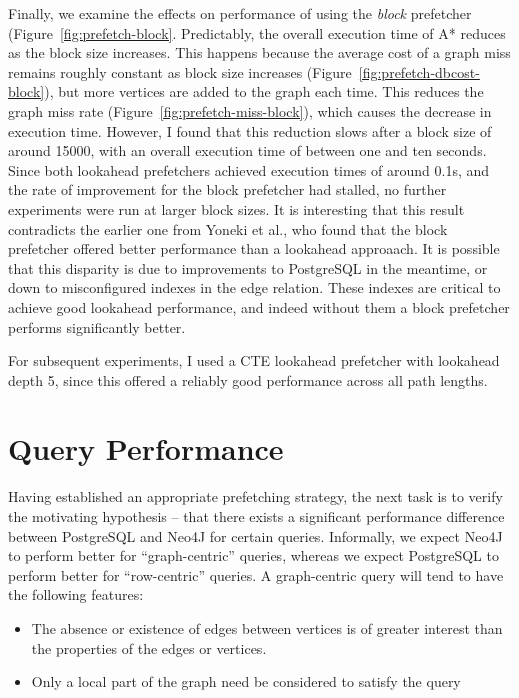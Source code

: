 Finally, we examine the effects on performance of using the \textit{block}
prefetcher (Figure~\ref{fig:prefetch-block}. Predictably, the overall
execution time of A* reduces as the block size increases. This happens because
the average cost of a graph miss remains roughly constant as block size
increases (Figure~\ref{fig:prefetch-dbcost-block}), but more vertices are
added to the graph each time. This reduces the graph miss rate
(Figure~\ref{fig:prefetch-miss-block}), which causes the decrease in execution
time. However, I found that this reduction slows after a block size of around
15000, with an  overall execution time of between one and ten seconds. Since
both lookahead prefetchers achieved execution times of around 0.1s, and the
rate of improvement for the block prefetcher had stalled, no further
experiments were run at larger block sizes. It is interesting that this result
contradicts the earlier one from Yoneki et al., who found that the block
prefetcher offered better performance than a lookahead approaach. It is
possible that this disparity is due to improvements to PostgreSQL in the
meantime, or down to misconfigured indexes in the edge relation. These indexes
are critical to achieve good lookahead performance, and indeed without them a
block prefetcher performs significantly better.


For subsequent experiments, I used a CTE lookahead prefetcher with lookahead depth
5, since this offered a reliably good performance across all path lengths. 


\section{Query Performance} %
\label{sec:query_performance}
 
Having established an appropriate prefetching strategy, the next task is to
verify the motivating hypothesis -- that there exists a significant
performance difference between PostgreSQL and Neo4J for certain queries.
Informally, we expect Neo4J to perform better for ``graph-centric'' queries,
whereas we expect PostgreSQL to perform better for ``row-centric'' queries. A
graph-centric query will tend to have the following features:

\begin{itemize}
	\item The absence or existence of edges between vertices is of greater interest than the properties of the edges or vertices.
	\item Only a local part of the graph need be considered to satisfy the query
\end{itemize}

